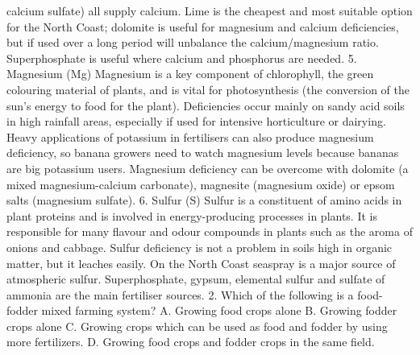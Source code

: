 calcium sulfate) all supply calcium. Lime is the cheapest and most suitable option for the North Coast; dolomite is useful for magnesium and calcium deficiencies, but if used over a long period will unbalance the calcium/magnesium ratio. Superphosphate is useful where calcium and phosphorus are needed. 5. Magnesium (Mg) Magnesium is a key component of chlorophyll, the green colouring material of plants, and is vital for photosynthesis (the conversion of the sun's energy to food for the plant). Deficiencies occur mainly on sandy acid soils in high rainfall areas, especially if used for intensive horticulture or dairying. Heavy applications of potassium in fertilisers can also produce magnesium deficiency, so banana growers need to watch magnesium levels because bananas are big potassium users. Magnesium deficiency can be overcome with dolomite (a mixed magnesium-calcium carbonate), magnesite (magnesium oxide) or epsom salts (magnesium sulfate). 6. Sulfur (S) Sulfur is a constituent of amino acids in plant proteins and is involved in energy-producing processes in plants. It is responsible for many flavour and odour compounds in plants such as the aroma of onions and cabbage. Sulfur deficiency is not a problem in soils high in organic matter, but it leaches easily. On the North Coast seaspray is a major source of atmospheric sulfur. Superphosphate, gypsum, elemental sulfur and sulfate of ammonia are the main fertiliser sources. 2. Which of the following is a food-fodder mixed farming system? A. Growing food crops alone B. Growing fodder crops alone C. Growing crops which can be used as food and fodder by using more fertilizers. D. Growing food crops and fodder crops in the same field. 

